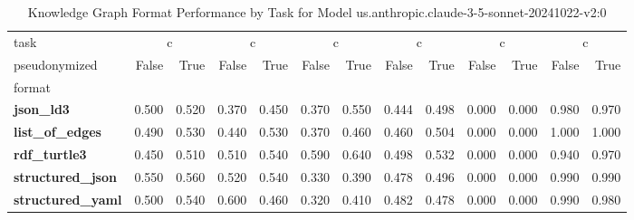 \begin{table}
\caption{Knowledge Graph Format Performance by Task for Model us.anthropic.claude-3-5-sonnet-20241022-v2:0}
\label{tab:results_us.anthropic.claude-3-5-sonnet-20241022-v2:0}
\begin{tabular}{lrrrrrrrrrrrr}
\toprule
task & \multicolumn{2}{c}{c}{AggByRelation} & \multicolumn{2}{c}{c}{AggNeighborProperties} & \multicolumn{2}{c}{c}{HighestDegreeNode} & \multicolumn{2}{c}{c}{Overall} & \multicolumn{2}{c}{c}{ShortestPath} & \multicolumn{2}{c}{c}{TripleRetrieval} \\
pseudonymized & False & True & False & True & False & True & False & True & False & True & False & True \\
format &  &  &  &  &  &  &  &  &  &  &  &  \\
\midrule
\textbf{json_ld3} & 0.500 & 0.520 & 0.370 & 0.450 & 0.370 & 0.550 & 0.444 & 0.498 & 0.000 & 0.000 & 0.980 & 0.970 \\
\textbf{list_of_edges} & 0.490 & 0.530 & 0.440 & 0.530 & 0.370 & 0.460 & 0.460 & 0.504 & 0.000 & 0.000 & 1.000 & 1.000 \\
\textbf{rdf_turtle3} & 0.450 & 0.510 & 0.510 & 0.540 & 0.590 & 0.640 & 0.498 & 0.532 & 0.000 & 0.000 & 0.940 & 0.970 \\
\textbf{structured_json} & 0.550 & 0.560 & 0.520 & 0.540 & 0.330 & 0.390 & 0.478 & 0.496 & 0.000 & 0.000 & 0.990 & 0.990 \\
\textbf{structured_yaml} & 0.500 & 0.540 & 0.600 & 0.460 & 0.320 & 0.410 & 0.482 & 0.478 & 0.000 & 0.000 & 0.990 & 0.980 \\
\bottomrule
\end{tabular}
\end{table}
